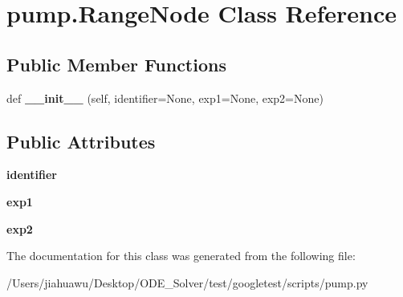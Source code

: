 \hypertarget{classpump_1_1_range_node}{}\section{pump.\+Range\+Node Class Reference}
\label{classpump_1_1_range_node}
\subsection*{Public Member Functions}
\begin{DoxyCompactItemize}
\item 
\mbox{\label{classpump_1_1_range_node_a58e85945a5a6e2f899e8243422c871e3}} 
def {\bfseries \+\_\+\+\_\+init\+\_\+\+\_\+} (self, identifier=None, exp1=None, exp2=None)
\end{DoxyCompactItemize}
\subsection*{Public Attributes}
\begin{DoxyCompactItemize}
\item 
\mbox{\label{classpump_1_1_range_node_ae75b9f31ba8c3bd048cf09b22035efa0}} 
{\bfseries identifier}
\item 
\mbox{\label{classpump_1_1_range_node_acbb59f8c5e23d23563ca03f21574ce63}} 
{\bfseries exp1}
\item 
\mbox{\label{classpump_1_1_range_node_afe153ee472b121652a51c62c1522cc13}} 
{\bfseries exp2}
\end{DoxyCompactItemize}


The documentation for this class was generated from the following file\+:\begin{DoxyCompactItemize}
\item 
/\+Users/jiahuawu/\+Desktop/\+O\+D\+E\+\_\+\+Solver/test/googletest/scripts/pump.\+py\end{DoxyCompactItemize}
